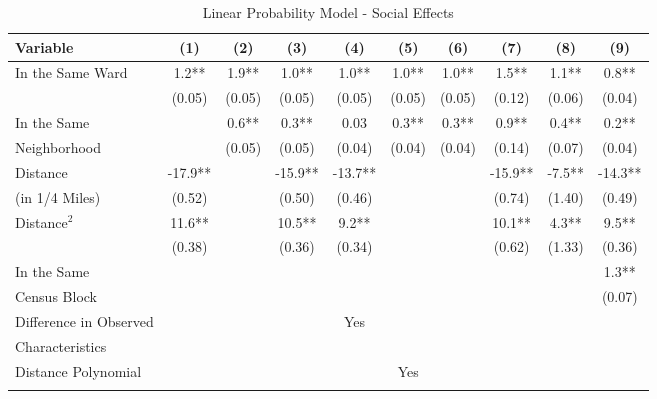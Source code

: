 \documentclass[12pt]{article}
\newcommand{\se}[1]{\footnotesize{(#1)}}
\begin{document}
\begin{sidewaystable}[ht]
\centering
\caption{Linear Probability Model - Social Effects}
\begin{tabular}{@{}lccccccccc@{}} \toprule
Variable                                 &(1)      &(2)      &(3)      &(4)      &(5)      &(6)      &(7)      &(8)      & (9)     \\\midrule
\multirow{2}{*}{In the Same Ward}        &1.2**    &1.9**    &1.0**    &1.0**    &1.0**    &1.0**    &1.5**    &1.1**    & 0.8**   \\
                                         &\se{0.05}&\se{0.05}&\se{0.05}&\se{0.05}&\se{0.05}&\se{0.05}&\se{0.12}&\se{0.06}&\se{0.04}\\
In the Same                              &         &0.6**    &0.3**    &0.03     &0.3**    &0.3**    &0.9**    &0.4**    & 0.2**   \\
\hspace{.5cm}Neighborhood                     &         &\se{0.05}&\se{0.05}&\se{0.04}&\se{0.04}&\se{0.04}&\se{0.14}&\se{0.07}&\se{0.04}\\
Distance                                 &-17.9**  &         &-15.9**  &-13.7**  &         &         &-15.9**  &-7.5**   &-14.3**  \\
\hspace{.5cm}(in 1/4 Miles)              &\se{0.52}&         &\se{0.50}&\se{0.46}&         &         &\se{0.74}&\se{1.40}&\se{0.49}\\
\multirow{2}{*}{Distance$^2$ }           &11.6**   &         &10.5**   &9.2**    &         &         &10.1**   &4.3**    &9.5**    \\
                                         &\se{0.38}&         &\se{0.36}&\se{0.34}&         &         &\se{0.62}&\se{1.33}&\se{0.36}\\
In the Same                              &         &         &         &         &         &         &         &         & 1.3**   \\
\hspace{.5cm} Census Block               &         &         &         &         &         &         &         &         &\se{0.07}\\
Difference in Observed&&&            & Yes &&&         &         &              \\
\hspace{.5cm} Characteristics\\
Distance Polynomial &         &         &         &             &Yes &  &  &  &                  \\\addlinespace

\end{tabular}
\end{sidewaystable}
\end{document}
